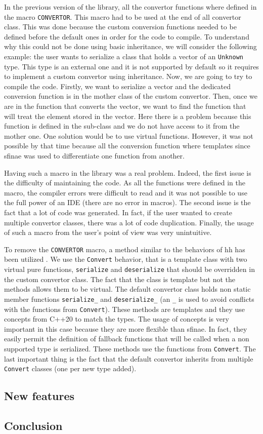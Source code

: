 In the previous version of the library, all the convertor functions where
defined in the macro \texttt{CONVERTOR}. This macro had to be used at the end of
all convertor class. This was done because the custom conversion functions
needed to be defined before the default ones in order for the code to compile.
To understand why this could not be done using basic inheritance, we will
consider the following example: the user wants to serialize a class that holds a
vector of an \texttt{Unknown} type. This type is an external one and it is not
supported by default so it requires to implement a custom convertor using
inheritance. Now, we are going to try to compile the code. Firstly, we want to
serialize a vector and the dedicated conversion function is in the mother class
of the custom convertor. Then, once we are in the function that converts the
vector, we want to find the function that will treat the element stored in the
vector. Here there is a problem because this function is defined in the
sub-class and we do not have access to it from the mother one. One solution
would be to use virtual functions. However, it was not possible by that time
because all the conversion function where templates since \gls{sfinae} was used
to differentiate one function from another.

Having such a macro in the library was a real problem. Indeed, the first issue
is the difficulty of maintaining the code. As all the functions were defined in
the macro, the compiler errors were difficult to read and it was not possible to
use the full power of an IDE (there are no error in macros). The second issue is
the fact that a lot of code was generated. In fact, if the user wanted to create
multiple convertor classes, there was a lot of code duplication. Finally, the
usage of such a macro from the user's point of view was very unintuitive.

To remove the \texttt{CONVERTOR} macro, a method similar to the behaviors of
\gls{hh} has been utilized \cite{bardakoff2021analysis}. We use the
\texttt{Convert} behavior, that is a template class with two virtual pure
functions, \texttt{serialize} and \texttt{deserialize} that should be overridden
in the custom convertor class. The fact that the class is template but not the
methods allows them to be virtual. The default convertor class holds non static
member functions \texttt{serialize\_} and \texttt{deserialize\_} (an \texttt{\_}
is used to avoid conflicts with the functions from \texttt{Convert}). These
methods are templates and they use concepts from C++20 to match the types. The
usage of concepts is very important in this case because they are more flexible
than \gls{sfinae}. In fact, they easily permit the definition of fallback
functions that will be called when a non supported type is serialized. These
methods use the functions from \texttt{Convert}. The last important thing is the
fact that the default convertor inherits from multiple \texttt{Convert} classes
(one per new type added).


\subsection{New features}

\subsection{Conclusion}
